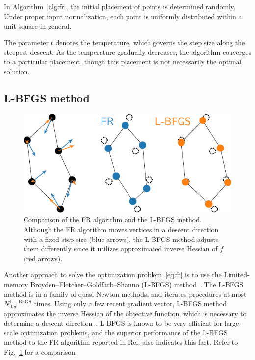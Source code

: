 \documentclass[dvipdfmx,journal]{IEEEtran}
\begin{document}
In Algorithm~\ref{alg:fr}, the initial placement of points is determined randomly. Under proper input normalization, each point is uniformly distributed within a unit square in general.

The parameter $t$ denotes the temperature, which governs the step size along the steepest descent. As the temperature gradually decreases, the algorithm converges to a particular placement, though this placement is not necessarily the optimal solution.

\subsection{L-BFGS method}\label{ssec:lbfgs}

\begin{figure}[t]
    \centering
    \includegraphics[width=0.713\columnwidth]{comparison/comparison_FRandLBFGS.pdf}
    \caption{
        Comparison of the FR algorithm and the L-BFGS method.
        Although the FR algorithm moves vertices in a descent direction with a fixed step size (blue arrows), the L-BFGS method adjusts them differently since it utilizes approximated inverse Hessian of $f$ (red arrows).
    }
    \label{fig:comparisonFRandLBFGS}
\end{figure}

Another approach to solve the optimization problem~\eqref{eq:fr} is to use the Limited-memory Broyden--Fletcher--Goldfarb--Shanno (L-BFGS) method~\cite{6183577}.
The L-BFGS method is in a family of quasi-Newton methods, and iterates procedures at most $N_\mathrm{iter}^{\mathrm{L-BFGS}}$ times.
Using only a few recent gradient vector, L-BFGS method approximates the inverse Hessian of the objective function, which is necessary to determine a descent direction~\cite{liuLimitedMemoryBFGS1989}.
L-BFGS is known to be very efficient for large-scale optimization problems, and the superior performance of the L-BFGS method to the FR algorithm reported in Ref.\cite{6183577} also indicates this fact. Refer to Fig.~\ref{fig:comparisonFRandLBFGS} for a comparison.
\end{document}
